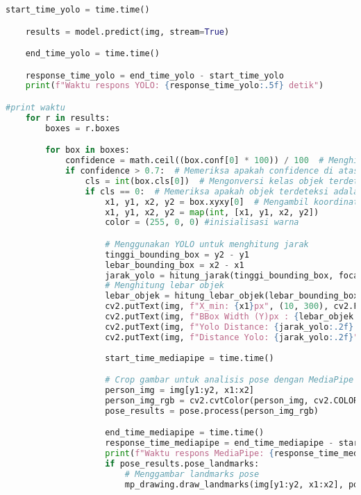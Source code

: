 \begin{lstlisting}[language=Python]
    start_time_yolo = time.time()

    results = model.predict(img, stream=True)

    end_time_yolo = time.time()

    response_time_yolo = end_time_yolo - start_time_yolo
    print(f"Waktu respons YOLO: {response_time_yolo:.5f} detik")

#print waktu
    for r in results:
        boxes = r.boxes

        for box in boxes:
            confidence = math.ceil((box.conf[0] * 100)) / 100  # Menghitung confidence
            if confidence > 0.7:  # Memeriksa apakah confidence di atas 0.6
                cls = int(box.cls[0])  # Mengonversi kelas objek terdeteksi menjadi integer
                if cls == 0:  # Memeriksa apakah objek terdeteksi adalah 'person'
                    x1, y1, x2, y2 = box.xyxy[0]  # Mengambil koordinat kotak pembatas objek
                    x1, y1, x2, y2 = map(int, [x1, y1, x2, y2])
                    color = (255, 0, 0) #inisialisasi warna

                    # Menggunakan YOLO untuk menghitung jarak
                    tinggi_bounding_box = y2 - y1
                    lebar_bounding_box = x2 - x1
                    jarak_yolo = hitung_jarak(tinggi_bounding_box, focal_length_pixel, tinggi_objek_nyata)
                    # Menghitung lebar objek
                    lebar_objek = hitung_lebar_objek(lebar_bounding_box, jarak_yolo, focal_length_pixel)
                    cv2.putText(img, f"X_min: {x1}px", (10, 300), cv2.FONT_HERSHEY_SIMPLEX, 0.6, (255, 255, 255), 2)
                    cv2.putText(img, f"BBox Width (Y)px : {lebar_objek:.2f} m", (10, 120), cv2.FONT_HERSHEY_SIMPLEX, 0.6, (255, 255, 255), 2)
                    cv2.putText(img, f"Yolo Distance: {jarak_yolo:.2f} m", (x1, y1 - 60), cv2.FONT_HERSHEY_SIMPLEX, 0.6, (255, 0, 0), 2)
                    cv2.putText(img, f"Distance Yolo: {jarak_yolo:.2f}", (10, 150), cv2.FONT_HERSHEY_SIMPLEX, 0.6, (255, 255, 255), 2)
                    
                    start_time_mediapipe = time.time()

                    # Crop gambar untuk analisis pose dengan MediaPipe
                    person_img = img[y1:y2, x1:x2]
                    person_img_rgb = cv2.cvtColor(person_img, cv2.COLOR_BGR2RGB)
                    pose_results = pose.process(person_img_rgb)

                    end_time_mediapipe = time.time()
                    response_time_mediapipe = end_time_mediapipe - start_time_mediapipe
                    print(f"Waktu respons MediaPipe: {response_time_mediapipe:.5f} detik")
                    if pose_results.pose_landmarks:
                        # Menggambar landmarks pose
                        mp_drawing.draw_landmarks(img[y1:y2, x1:x2], pose_results.pose_landmarks, mp_pose.POSE_CONNECTIONS)


\end{lstlisting}
